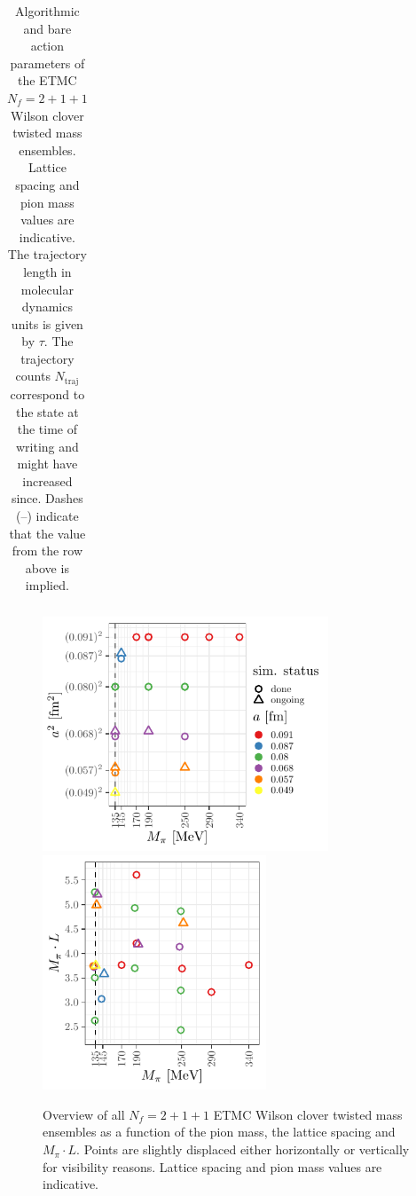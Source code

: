\documentclass[a4paper,11pt]{article}
\begin{document}
\begin{table}
{\begin{tabular}{lrrllllllllll}
    \end{tabular}%
  }
  \caption{Algorithmic and bare action parameters of the ETMC $N_f=2+1+1$ Wilson clover twisted mass ensembles. Lattice spacing and pion mass values are indicative. The trajectory length in molecular dynamics units is given by $\tau$. The trajectory counts $N_\textrm{traj}$ correspond to the state at the time of writing and might have increased since. Dashes (--) indicate that the value from the row above is implied.}
  \label{tab:ens}
\end{table}

\begin{figure}
  \includegraphics[height=7cm]{plots/ensembles_asquared_mpi}\hfill
  \includegraphics[height=7cm]{plots/ensembles_L_vs_mpi}
  \caption{Overview of all $N_f=2+1+1$ ETMC Wilson clover twisted mass ensembles as a function of the pion mass, the lattice spacing and $M_\pi \cdot L$. Points are slightly displaced either horizontally or vertically for visibility reasons. Lattice spacing and pion mass values are indicative.}
  \label{fig:ensemble_overview}
\end{figure}
\end{document}
